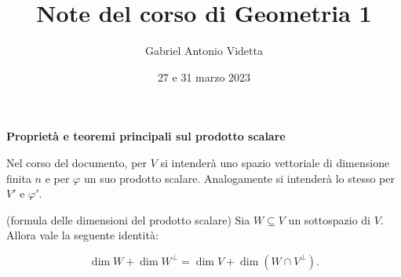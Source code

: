 \documentclass[11pt]{article}
\title{\textbf{Note del corso di Geometria 1}}
\author{Gabriel Antonio Videtta}
\date{27 e 31 marzo 2023}
\begin{document}
	
	\maketitle
	
	\begin{center}
		\Large \textbf{Proprietà e teoremi principali sul prodotto scalare}
	\end{center}
	
	\begin{note}
		Nel corso del documento, per $V$ si intenderà uno spazio vettoriale di dimensione
		finita $n$ e per $\varphi$ un suo prodotto scalare. Analogamente si intenderà lo stesso
		per $V'$ e $\varphi'$.
	\end{note}
	
	\begin{proposition} (formula delle dimensioni del prodotto scalare)
		Sia $W \subseteq V$ un sottospazio di $V$. Allora vale la seguente identità:
		
		\[ \dim W + \dim W^\perp = \dim V + \dim (W \cap V^\perp). \]
	\end{proposition}
\end{document}

